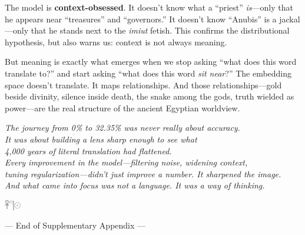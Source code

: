 \documentclass[11pt, a4paper]{article}
\newcommand{\bighiero}[1]{{\normalfont\hierofont\fontsize{48}{56}\selectfont #1}}
\newcommand{\displayglyph}[1]{%
  \begin{center}
  \bighiero{#1}
  \end{center}
  \vspace{-6pt}
}
\newenvironment{vectorbox}{%
  \begin{oframed}%
}{%
  \end{oframed}%
}
\begin{document}
\noindent
The model is \textbf{context-obsessed}. It doesn't know what a ``priest'' \emph{is}---only that he appears near ``treasures'' and ``governors.'' It doesn't know ``Anubis'' is a jackal---only that he stands next to the \textit{imiut} fetish. This confirms the distributional hypothesis, but also warns us: context is not always meaning.

But meaning is exactly what emerges when we stop asking ``what does this word translate to?'' and start asking ``what does this word \emph{sit near}?'' The embedding space doesn't translate. It maps relationships. And those relationships---gold beside divinity, silence inside death, the snake among the gods, truth wielded as power---are the real structure of the ancient Egyptian worldview.

\begin{vectorbox}
\centering
\textit{The journey from 0\% to 32.35\% was never really about accuracy.}\\[4pt]
\textit{It was about building a lens sharp enough to see what}\\
\textit{4,000 years of literal translation had flattened.}\\[4pt]
\textit{Every improvement in the model---filtering noise, widening context,}\\
\textit{tuning regularization---didn't just improve a number. It sharpened the image.}\\[4pt]
\textit{And what came into focus was not a language. It was a way of thinking.}
\end{vectorbox}

\vfill

\begin{center}
\displayglyph{𓋹𓊹𓇳}
\vspace{4pt}
{\small\color{lapis} --- End of Supplementary Appendix ---}
\end{center}
\end{document}
